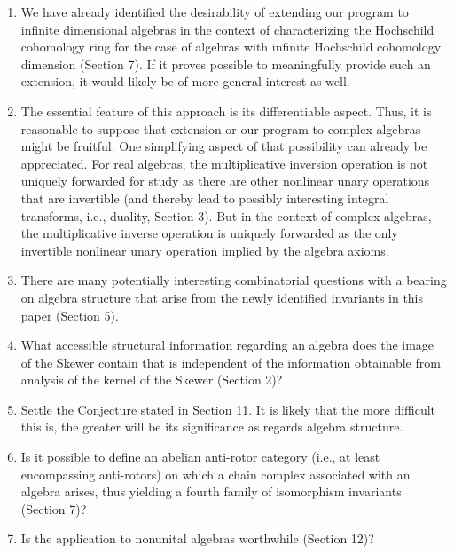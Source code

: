 \documentclass{amsart}
\numberwithin{equation}{section}
\theoremstyle{definition}
\numberwithin{theorem}{section}
\begin{document}
\begin{enumerate}\item We have already identified the desirability of extending our program to \mbox{infinite} dimensional algebras in the context of characterizing the Hochschild cohomology ring for the case of algebras with infinite Hochschild cohomology dimension (Section 7).  If it proves possible to meaningfully provide such an extension, it would likely be of more general interest as well.
\item The essential feature of this approach is its differentiable aspect.  Thus, it is reasonable to suppose that extension or our program to complex algebras might be fruitful.  One simplifying aspect of that possibility can already be appreciated.  For real algebras, the multiplicative inversion operation is not uniquely forwarded for study as there are other nonlinear unary operations that are invertible (and thereby lead to possibly interesting integral transforms, i.e., duality, Section 3).  But in the context of complex algebras, the multiplicative inverse operation is uniquely forwarded as the only invertible nonlinear unary operation implied by the algebra axioms.
\item There are many potentially interesting combinatorial questions with a bearing on algebra structure that arise from the newly identified invariants in this paper (Section 5). 
\item What accessible structural information regarding an algebra does the image of the Skewer contain that is independent of the information obtainable from analysis of the kernel of the Skewer (Section 2)? 
\item Settle the Conjecture stated in Section 11.  It is likely that the more difficult this is, the greater will be its significance as regards algebra structure.
\item Is it possible to define an abelian anti-rotor category  (i.e., at least encompassing anti-rotors) on which a chain complex associated with an algebra arises, thus yielding a fourth family of isomorphism invariants (Section 7)?
\item Is the application to nonunital algebras worthwhile (Section 12)?
\end{enumerate}

\bigskip

\enlargethispage{1.5cm}
\end{document}
